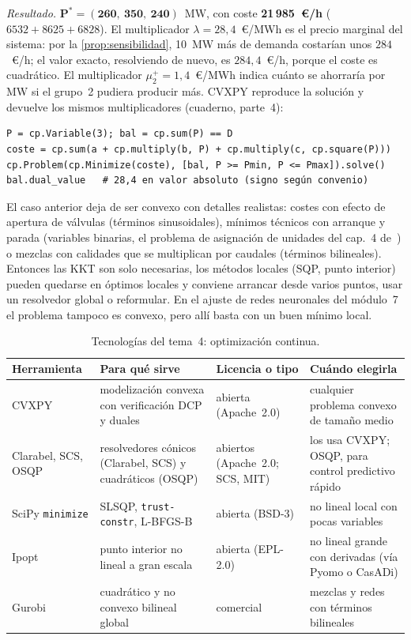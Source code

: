 \begin{ejemplo}
\emph{Resultado.} $\bm{P^{*}=(260,\ 350,\ 240)}$~MW, con coste \textbf{21\,985~€/h} ($6532+8625+6828$). El multiplicador $\lambda=28{,}4$~€/MWh es el precio marginal del sistema: por la \cref{prop:sensibilidad}, 10~MW más de demanda costarían unos $284$~€/h; el valor exacto, resolviendo de nuevo, es $284{,}4$~€/h, porque el coste es cuadrático. El multiplicador $\mu_2^{+}=1{,}4$~€/MWh indica cuánto se ahorraría por MW si el grupo~2 pudiera producir más. CVXPY reproduce la solución y devuelve los mismos multiplicadores (cuaderno, parte~4):
\begin{verbatim}
P = cp.Variable(3); bal = cp.sum(P) == D
coste = cp.sum(a + cp.multiply(b, P) + cp.multiply(c, cp.square(P)))
cp.Problem(cp.Minimize(coste), [bal, P >= Pmin, P <= Pmax]).solve()
bal.dual_value   # 28,4 en valor absoluto (signo según convenio)
\end{verbatim}
\end{ejemplo}

\begin{observacion}\label{obs:noconvexo}
El caso anterior deja de ser convexo con detalles realistas: costes con efecto de apertura de válvulas (términos sinusoidales), mínimos técnicos con arranque y parada (variables binarias, el problema de asignación de unidades del cap.~4 de~\cite{wood}) o mezclas con calidades que se multiplican por caudales (términos bilineales). Entonces las KKT son solo necesarias, los métodos locales (SQP, punto interior) pueden quedarse en óptimos locales y conviene arrancar desde varios puntos, usar un resolvedor global o reformular. En el ajuste de redes neuronales del módulo~7 el problema tampoco es convexo, pero allí basta con un buen mínimo local.
\end{observacion}

\begin{table}[h]
\centering\small
\caption{Tecnologías del tema~4: optimización continua.}\label{tab:tec4}
\begin{tabularx}{\textwidth}{@{}l>{\raggedright\arraybackslash}X>{\raggedright\arraybackslash}p{2.2cm}>{\raggedright\arraybackslash}X@{}}
\toprule
Herramienta & Para qué sirve & Licencia o tipo & Cuándo elegirla \\
\midrule
CVXPY~\cite{cvxpy} & modelización convexa con verificación DCP y duales & abierta (Apache~2.0) & cualquier problema convexo de tamaño medio \\
Clarabel, SCS, OSQP & resolvedores cónicos (Clarabel, SCS) y cuadráticos (OSQP) & abiertos (Apache~2.0; SCS, MIT) & los usa CVXPY; OSQP, para control predictivo rápido \\
SciPy \texttt{minimize} & SLSQP, \texttt{trust-constr}, L-BFGS-B & abierta (BSD-3) & no lineal local con pocas variables \\
Ipopt & punto interior no lineal a gran escala & abierta (EPL-2.0) & no lineal grande con derivadas (vía Pyomo o CasADi) \\
Gurobi & cuadrático y no convexo bilineal global & comercial & mezclas y redes con términos bilineales \\
\bottomrule
\end{tabularx}
\end{table}

